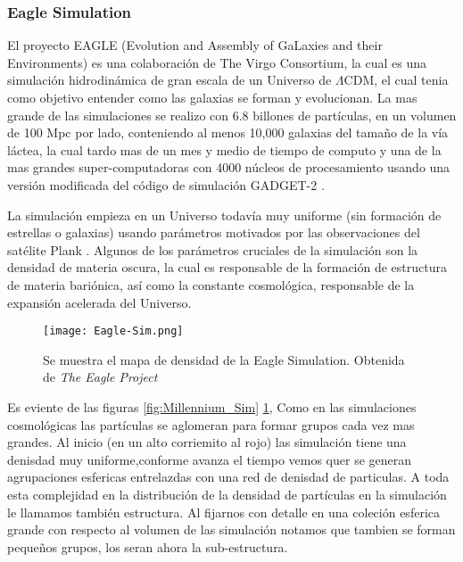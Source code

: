 \subsubsection{Eagle Simulation}
El proyecto EAGLE (Evolution and Assembly of GaLaxies and their Environments)  es una colaboración de The Virgo Consortium, la cual es una simulación hidrodinámica de gran escala de un Universo de $\Lambda$CDM, el cual tenia como objetivo entender como las galaxias se forman y evolucionan. La mas grande de las simulaciones se realizo con  6.8 billones de partículas, en un volumen de 100 Mpc por lado, conteniendo al menos 10,000 galaxias del tamaño de la vía láctea, la cual tardo mas de un mes y medio de tiempo de computo y una de la mas grandes super-computadoras con 4000 núcleos de procesamiento usando una versión modificada del código de simulación GADGET-2 \cite{2015MNRAS.450.1937C, 2015MNRAS.446..521S}.

La simulación empieza en un Universo todavía muy uniforme (sin formación de estrellas o galaxias) usando parámetros motivados por las observaciones del satélite Plank \cite{ 2013ApJS..208...20B, 2020A&A...641A...1P}. Algunos de los parámetros cruciales de la simulación son la densidad de materia oscura, la cual es responsable de la formación de estructura de materia bariónica, así como la constante cosmológica, responsable de la expansión acelerada del Universo.
       
\begin{figure}[H]
    \centering
    \texttt{[image: Eagle-Sim.png]}
    \caption[Eagle Simulation Cosmic Web]{Se muestra el mapa de densidad de la Eagle Simulation. Obtenida de \textit{The Eagle Project} }
    \label{fig:Eagle_Sim}
\end{figure}

{\blues Es eviente de las figuras \ref{fig:Millennium_Sim} \ref{fig:Eagle_Sim}, Como en las simulaciones cosmológicas las partículas se aglomeran para formar grupos cada vez mas grandes. Al inicio (en un alto corriemito al rojo) las simulación tiene una denisdad muy uniforme,conforme avanza el tiempo vemos quer se generan agrupaciones esfericas entrelazdas con una red de denisdad de particulas. A toda esta complejidad en la distribución de la densidad de partículas en la simulación le llamamos también estructura. Al fijarnos con detalle en una coleción esferica grande con respecto al volumen de las simulación notamos que tambien se forman pequeños grupos, los seran ahora la sub-estructura.}
